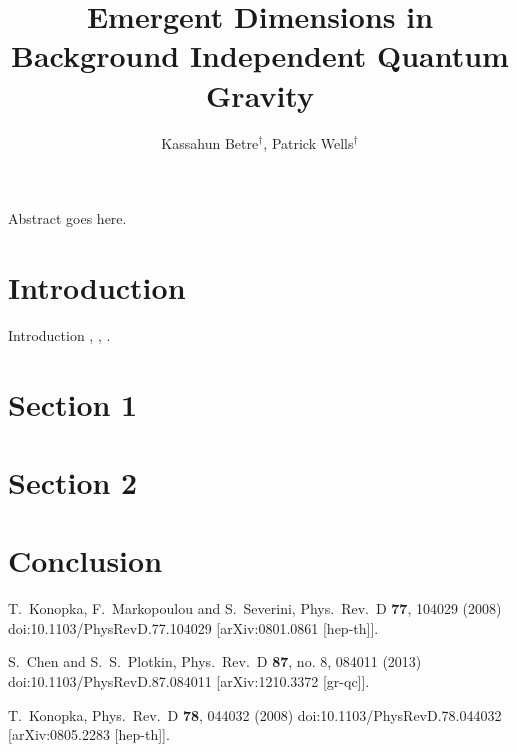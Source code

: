 \documentclass[prd,12pt,nofootinbib]{revtex4}
\begin{document}
\begin{titlepage}
\title{Emergent Dimensions in Background Independent Quantum Gravity}
\author{Kassahun Betre$^{\dagger}$, Patrick Wells$^{\dagger}$}
\address{$^{\dagger}$Pepperdine University, 24255 Pacific Coast Hwy, Malibu, CA 90263, USA}

\maketitle

\begin{Abstract}
Abstract goes here.

\end{Abstract}

\end{titlepage}

\section{Introduction}
Introduction \cite{Konopka:2008hp}, \cite{Chen:2012ui}, \cite{Konopka:2008ds}.
\section{Section 1}
\section{Section 2}
\section{Conclusion}  
\begin{thebibliography}{99}
  


  T.~Konopka, F.~Markopoulou and S.~Severini,
  Phys.\ Rev.\ D {\bf 77}, 104029 (2008)
  doi:10.1103/PhysRevD.77.104029
  [arXiv:0801.0861 [hep-th]].

  S.~Chen and S.~S.~Plotkin,
  Phys.\ Rev.\ D {\bf 87}, no. 8, 084011 (2013)
  doi:10.1103/PhysRevD.87.084011
  [arXiv:1210.3372 [gr-qc]].


  T.~Konopka,
  Phys.\ Rev.\ D {\bf 78}, 044032 (2008)
  doi:10.1103/PhysRevD.78.044032
  [arXiv:0805.2283 [hep-th]].

 
\end{thebibliography}
\end{document}
